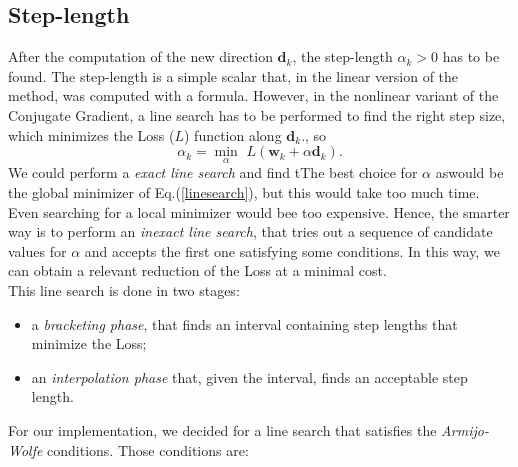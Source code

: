 \subsection{Step-length}\label{alpha}
After the computation of the new direction $\mathbf{d}_k$, the step-length $\alpha_k > 0$ has to be found. The step-length is a simple scalar that, in the linear version of the method, was computed with a formula. However, in the nonlinear variant of the Conjugate Gradient, a line search has to be performed to find the right step size, which minimizes the Loss ($L$) function along $\mathbf{d}_k$., so
\begin{equation}\label{linesearch}
    \alpha_k = \min\limits_{\alpha} \,\, L(\mathbf{w}_k + \alpha \mathbf{d}_k).
\end{equation}
We could perform a \emph{exact line search} and find tThe best choice for $\alpha$ aswould be the global minimizer of Eq.(\ref{linesearch}), but this would take too much time. Even searching for a local minimizer would bee too expensive. Hence, the smarter way is to perform an \emph{inexact line search}, that tries out a sequence of candidate values for $\alpha$ and accepts the first one satisfying some conditions. In this way, we can obtain a relevant reduction of the Loss at a minimal cost.\\
This line search is done in two stages:
\begin{itemize}
    \item a \emph{bracketing phase}, that finds an interval containing step lengths that minimize the Loss;
    \item an \emph{interpolation phase} that, given the interval, finds an acceptable step length.
\end{itemize}
For our implementation, we decided for a line search that satisfies the \emph{Armijo-Wolfe} conditions. Those conditions are:
